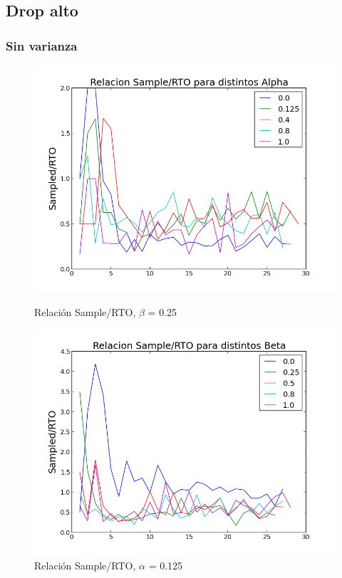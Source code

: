 \subsection{Drop alto}
\subsubsection{Sin varianza}

\begin{figure}[H]
\begin{minipage}{0.5\linewidth}
\includegraphics[width=\linewidth]{../graficos/alphavar0drop70.png}
\caption{Relación Sample/RTO, $\beta$ = 0.25}\label{fig:alpha-var0-drop70}
\end{minipage}
\hfill
\begin{minipage}{0.5\linewidth}
\includegraphics[width=\linewidth]{../graficos/betavar0drop70.png}
\caption{Relación Sample/RTO, $\alpha$ = 0.125}\label{fig:beta-var0-drop70}
\end{minipage}
\end{figure}

